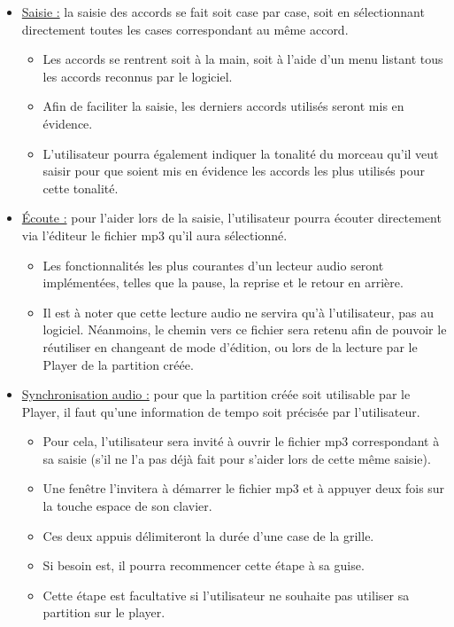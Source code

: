 \documentclass[a4paper,11pt]{article}
\begin{document}
\begin{itemize}
 \item \underline{Saisie :} la saisie des accords se fait soit case par case, soit en sélectionnant directement toutes les cases correspondant au même accord.
 \begin{itemize}
  \item Les accords se rentrent soit à la main, soit à l'aide d'un menu listant tous les accords reconnus par le logiciel.
  \item Afin de faciliter la saisie, les derniers accords utilisés seront mis en évidence.
  \item L'utilisateur pourra également indiquer la tonalité du morceau qu'il veut saisir pour que soient mis en évidence les accords les plus utilisés pour cette tonalité.
 \end{itemize}
 \item \underline{Écoute :} pour l'aider lors de la saisie, l'utilisateur pourra écouter directement via l'éditeur le fichier mp3 qu'il aura sélectionné.
 \begin{itemize}
  \item Les fonctionnalités les plus courantes d'un lecteur audio seront implémentées, telles que la pause, la reprise et le retour en arrière.
  \item Il est à noter que cette lecture audio ne servira qu'à l'utilisateur, pas au logiciel. Néanmoins, le chemin vers ce fichier sera retenu afin de pouvoir le réutiliser en changeant de mode d'édition, ou lors de la lecture par le Player de la partition créée.
 \end{itemize}
 \item \underline{Synchronisation audio :} pour que la partition créée soit utilisable par le Player, il faut qu'une information de tempo soit précisée par l'utilisateur.
 \begin{itemize}
  \item Pour cela, l'utilisateur sera invité à ouvrir le fichier mp3 correspondant à sa saisie (s'il ne l'a pas déjà fait pour s'aider lors de cette même saisie).
  \item Une fenêtre l'invitera à démarrer le fichier mp3 et à appuyer deux fois sur la touche espace de son clavier.
  \item Ces deux appuis délimiteront la durée d'une case de la grille.
  \item Si besoin est, il pourra recommencer cette étape à sa guise.
  \item Cette étape est facultative si l'utilisateur ne souhaite pas utiliser sa partition sur le player.
 \end{itemize}
\end{itemize}
\end{document}
